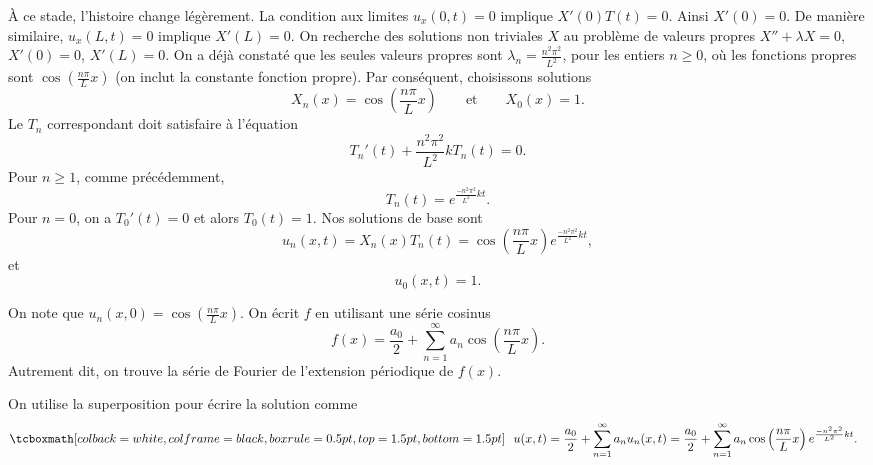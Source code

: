 À ce stade, l'histoire change légèrement.
La condition aux limites $u_x(0,t) = 0$ implique  $X'(0)T(t) = 0$.
Ainsi $X'(0) = 0$.  De manière similaire,  $u_x(L,t) = 0$ implique $X'(L) = 0$.  On
recherche des solutions non triviales $ X $ au problème de valeurs propres
$X'' + \lambda X = 0$, $X'(0) = 0$, $X'(L) = 0$.  On a déjà constaté que
les seules valeurs propres sont $\lambda_n = \frac{n^2 \pi^2}{L^2}$,  pour les entiers
$n \geq 0$,
où les fonctions propres sont $\cos \left( \frac{n \pi}{L} x\right)$
(on inclut la constante
fonction propre).  Par conséquent,  choisissons
solutions
\begin{equation*}
X_n (x) = \cos \left( \frac{n \pi}{L} x \right)
\qquad \text{et} \qquad
X_0 (x) = 1.
\end{equation*}
Le $ T_n $ correspondant doit satisfaire à l'équation
\begin{equation*}
T_n'(t) + \frac{n^2 \pi^2}{L^2} k T_n(t) = 0 .
\end{equation*}
Pour $n \geq 1$,  comme précédemment,
\begin{equation*}
T_n(t) = e^{\frac{-n^2 \pi^2}{L^2} k t} .
\end{equation*}
Pour $n = 0$,  on a $T_0'(t) = 0$ et alors $T_0(t) = 1$.
Nos solutions de base sont
\begin{equation*}
u_n(x,t) = X_n(x)T_n(t) =
\cos \left( \frac{n \pi}{L} x \right)
e^{\frac{-n^2 \pi^2}{L^2} k t} ,
\end{equation*}
et
\begin{equation*}
u_0(x,t) = 1 .
\end{equation*}

On note que $u_n(x,0) = \cos \left( \frac{n \pi}{L} x \right)$.  On écrit $f$ en utilisant une série cosinus 
\begin{equation*}
f(x) = \frac{a_0}{2} + \sum_{n=1}^\infty a_n \cos \left( \frac{n \pi}{L} x
\right) .
\end{equation*}
Autrement dit,  on trouve la série de Fourier de l'extension  périodique de $f(x)$.

On utilise la superposition pour écrire la solution comme
\begin{equation*}
\mybxbg{~~
u(x,t) = 
\frac{a_0}{2} + 
\sum_{n=1}^\infty
a_n
u_n(x,t)
=
\frac{a_0}{2} + 
\sum_{n=1}^\infty
a_n
\cos \left( \frac{n \pi}{L} x \right)
e^{\frac{-n^2 \pi^2}{L^2} k t} .
~~}
\end{equation*}

